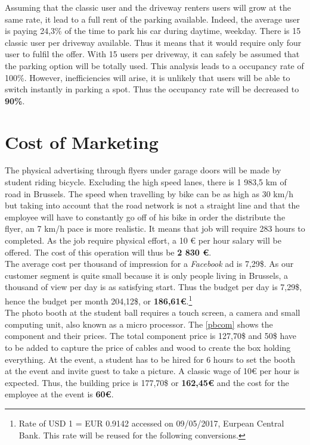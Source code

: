 \documentclass[12pt,a4paper,oneside]{book}
\begin{document}
Assuming that the classic user and the driveway renters users will grow at the same rate, it lead to a full rent of the parking available. Indeed, the average user is paying 24,3\% of the time to park his car during daytime, weekday. There is 15 classic user per driveway available. Thus it means that it would require only four user to fulfil the offer. With 15 users per driveway, it can safely be assumed that the parking option will be totally used. This analysis leads to a occupancy rate of 100\%. However, inefficiencies will arise, it is unlikely that users will be able to switch instantly in parking a spot. Thus the occupancy rate will be decreased to \textbf{90\%}.

\section{Cost of Marketing}
\label{scom}

The physical advertising through flyers under garage doors will be made by student riding bicycle. Excluding the high speed lanes, there is 1 983,5 km of road in Brussels.\cite{mtvr} The speed when travelling by bike can be as high as 30 km/h but taking into account that the road network is not a straight line and that the employee will have to constantly go off of his bike in order the distribute the flyer, an 7 km/h pace is more realistic. It means that job will require 283 hours to completed. As the job require physical effort, a 10 \euro{} per hour salary will be offered. The cost of this operation will thus be \textbf{2 830 \euro{}}.\\

The average cost per thousand of impression for a \textit{Facebook} ad is 7,29\$.\cite{fbad} As our customer segment is quite small because it is only people living in Brussels, a thousand of view per day is as satisfying start. Thus the budget per day is 7,29\$, hence the budget per month 204,12\$, or \textbf{186,61\euro{}}.\footnote{Rate of USD 1 = EUR 0.9142 accessed on 09/05/2017, Eurpean Central Bank. This rate will be reused for the following conversions.}\\

The photo booth at the student ball requires a touch screen, a camera and small computing unit, also known as a micro processor. The \autoref{pbcom} shows the component and their prices. The total component price is 127,70\$ and 50\$ have to be added to capture the price of cables and wood to create the box holding everything. At the event, a student has to be hired for 6 hours to set the booth at the event and invite guest to take a picture. A classic wage of 10\euro{} per hour is expected. Thus, the building price is 177,70\$ or \textbf{162,45\euro{}} and the cost for the employee at the event is \textbf{60\euro{}}.\\
\end{document}
